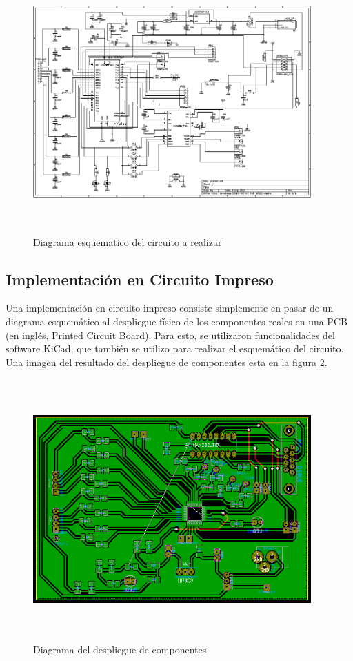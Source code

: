 \documentclass{article}
\theoremstyle{definition}
\theoremstyle{remark}
\begin{document}
\begin{figure}[h]
  \centering
  \includegraphics[width=0.95\textwidth, height = 10cm]{esquematico}
  \caption{\small Diagrama esquematico del circuito a realizar}\label{fig:esquematico}
\end{figure}



\subsection{Implementación en Circuito Impreso} %
\label{sub:implementacion_en_circuito_impreso}

Una implementación en circuito impreso consiste simplemente en pasar de un diagrama esquemático al despliegue físico de los componentes reales en una PCB (en inglés, Printed Circuit Board). Para esto, se utilizaron funcionalidades del software KiCad, que también se utilizo para realizar el esquemático del circuito. Una imagen del resultado del despliegue de componentes esta en la figura \ref{fig:PCB1}.

\begin{figure}[h]
  \centering
  \includegraphics[width=0.95\textwidth, height = 10cm]{PCB1}
  \caption{\small Diagrama del despliegue de componentes}\label{fig:PCB1}
\end{figure}
\end{document}
